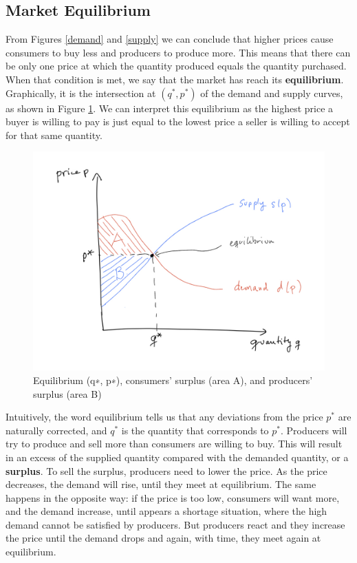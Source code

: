\documentclass[11pt, letterpaper]{article}
\begin{document}
\subsection{Market Equilibrium}

From Figures \ref{demand} and \ref{supply} we can conclude that higher prices cause consumers to buy less and producers to produce more. This means that there can be only one price at which the quantity produced equals the quantity purchased. When that condition is met, we say that the market has reach its \textbf{equilibrium}.  Graphically, it is the intersection at $(q^{\ast},p^{\ast})$ of the demand and supply curves, as shown in Figure \ref{equi}.  We can interpret this equilibrium as the highest price a buyer is willing to pay is just equal to the lowest price a seller is willing to accept for that same quantity.

 \begin{figure}[ht!]
  \includegraphics[width=\textwidth]{equilibrium.jpeg}
 \caption{Equilibrium (q∗, p∗), consumers’ surplus (area A), and producers’ surplus (area B)}
 \label{equi}
\end{figure}

Intuitively, the word equilibrium tells us that any deviations from the price $p^{\ast}$ are naturally corrected, and $q^{\ast}$ is the quantity that corresponds to $p^{\ast}$. Producers will try to produce and sell more than consumers are willing to buy. This will result in an excess of the supplied quantity compared with the demanded quantity, or a \textbf{surplus}. To sell the surplus, producers need to lower the price. As the price decreases, the demand will rise, until they meet at equilibrium. The same happens in the opposite way: if the price is too low, consumers will want more, and the demand increase, until appears a shortage situation, where the high demand cannot be satisfied by producers. But producers react and they increase the price until the demand drops and again, with time, they meet again at equilibrium.
\end{document}
